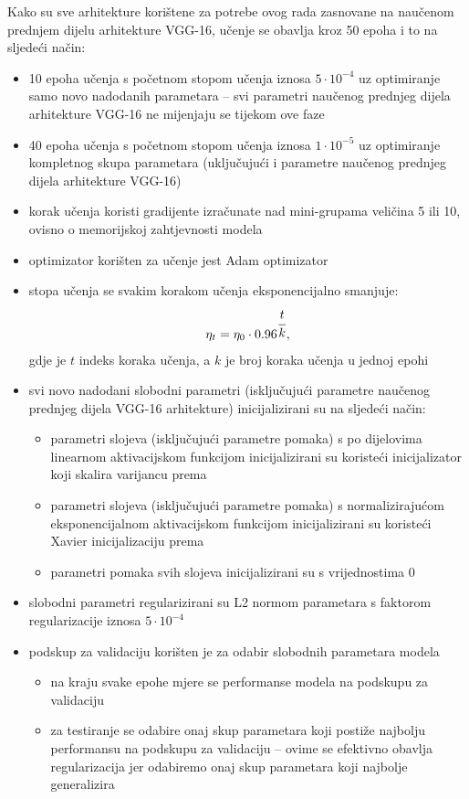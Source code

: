 \documentclass[times, utf8, diplomski, numeric]{fer}
\begin{document}
Kako su sve arhitekture korištene za potrebe ovog rada zasnovane na naučenom prednjem dijelu arhitekture VGG-16, učenje se obavlja kroz 50 epoha i to na sljedeći način:
\begin{itemize}
 \item 10 epoha učenja s početnom stopom učenja iznosa $5\cdot10^{-4}$ uz optimiranje samo novo nadodanih parametara -- svi parametri naučenog prednjeg dijela arhitekture VGG-16 ne mijenjaju se tijekom ove faze
 \item 40 epoha učenja s početnom stopom učenja iznosa $1\cdot10^{-5}$ uz optimiranje kompletnog skupa parametara (uključujući i parametre naučenog prednjeg dijela arhitekture VGG-16)
 \item korak učenja koristi gradijente izračunate nad mini-grupama veličina 5 ili 10, ovisno o memorijskoj zahtjevnosti modela
 \item optimizator korišten za učenje jest Adam optimizator
 \item stopa učenja se svakim korakom učenja eksponencijalno smanjuje:
 \begin{align}
  \eta_{t}=\eta_0 \cdot 0.96^{\cfrac{t}{k}},
 \end{align}
gdje je $t$ indeks koraka učenja, a $k$ je broj koraka učenja u jednoj epohi
 \item svi novo nadodani slobodni parametri (isključujući parametre naučenog prednjeg dijela VGG-16 arhitekture) inicijalizirani su na sljedeći način:
 \begin{itemize}
  \item parametri slojeva (isključujući parametre pomaka) s po dijelovima linearnom aktivacijskom funkcijom inicijalizirani su koristeći inicijalizator koji skalira varijancu prema \citep{article:delving_deep_into_rectifiers}
  \item parametri slojeva (isključujući parametre pomaka) s normalizirajućom eksponencijalnom aktivacijskom funkcijom inicijalizirani su koristeći Xavier inicijalizaciju prema \citep{article:delving_deep_into_rectifiers}
  \item parametri pomaka svih slojeva inicijalizirani su s vrijednostima 0
 \end{itemize}

 \item slobodni parametri regularizirani su L2 normom parametara s faktorom regularizacije iznosa $5\cdot10^{-4}$
 \item podskup za validaciju korišten je za odabir slobodnih parametara modela
 \begin{itemize}
  \item na kraju svake epohe mjere se performanse modela na podskupu za validaciju
  \item za testiranje se odabire onaj skup parametara koji postiže najbolju performansu na podskupu za validaciju -- ovime se efektivno obavlja regularizacija jer odabiremo onaj skup parametara koji najbolje generalizira
 \end{itemize}
\end{itemize}
\end{document}
